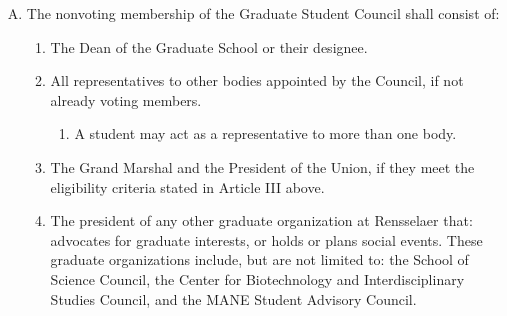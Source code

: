 \documentclass[letterpaper,12pt]{article}
\begin{document}
\begin{enumerate}[A.]
	\item The non­voting membership of the Graduate Student Council shall consist of:
	\begin{enumerate}[1.]
		\item The Dean of the Graduate School or their designee.
		\item All representatives to other bodies appointed by the Council, if not already voting members.
		\begin{enumerate}[1.]
			\item A student may act as a representative to more than one body.
		\end{enumerate}
		\item The Grand Marshal and the President of the Union, if they meet the eligibility criteria stated in Article III above.
		\item The president of any other graduate organization at Rensselaer that: advocates for graduate interests, or holds or plans social events. These graduate organizations include, but are not limited to: the School of Science Council, the Center for Biotechnology and Interdisciplinary Studies Council, and the MANE Student Advisory Council.
	\end{enumerate}
\end{enumerate}
\end{document}
